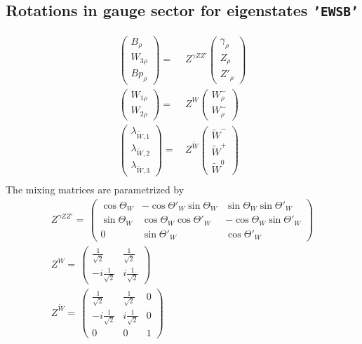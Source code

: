 \subsection{Rotations in gauge sector for eigenstates {\tt 'EWSB'} } 
\begin{align} 
\left(\begin{array}{c} 
B_{{\rho}}\\ 
W_{{3 \rho}}\\ 
Bp_{{\rho}}\end{array} \right) 
 = & \,Z^{\gamma Z Z'}
\left(\begin{array}{c} 
\gamma_{{\rho}}\\ 
Z_{{\rho}}\\ 
{Z'}_{{\rho}}\end{array} \right) \\ 
\left(\begin{array}{c} 
W_{{1 \rho}}\\ 
W_{{2 \rho}}\end{array} \right) 
 = & \,Z^{W}
\left(\begin{array}{c} 
W^-_{{\rho}}\\ 
W^-_{{\rho}}\end{array} \right) \\ 
\left(\begin{array}{c} 
\lambda_{{\tilde{W}},{1}}\\ 
\lambda_{{\tilde{W}},{2}}\\ 
\lambda_{{\tilde{W}},{3}}\end{array} \right) 
 = & \,Z^{\tilde{W}}
\left(\begin{array}{c} 
\tilde{W}^-\\ 
\tilde{W}^+\\ 
\tilde{W}^0\end{array} \right) \\ 
\end{align} 
The mixing matrices are parametrized by \\ 
\begin{align} 
Z^{\gamma Z Z'}= \, \left( 
\begin{array}{ccc} 
\cos\Theta_W  & - \cos{\Theta'}_W  \sin\Theta_W   & \sin\Theta_W  \sin{\Theta'}_W   \\ 
 \sin\Theta_W  & \cos\Theta_W  \cos{\Theta'}_W   & - \cos\Theta_W  \sin{\Theta'}_W   \\ 
 0 & \sin{\Theta'}_W  & \cos{\Theta'}_W \end{array} 
\right) \\ 
Z^{W}= \, \left( 
\begin{array}{cc} 
\frac{1}{\sqrt{2}} & \frac{1}{\sqrt{2}} \\ 
 -i \frac{1}{\sqrt{2}}  & i \frac{1}{\sqrt{2}} \end{array} 
\right) \\ 
Z^{\tilde{W}}= \, \left( 
\begin{array}{ccc} 
\frac{1}{\sqrt{2}} & \frac{1}{\sqrt{2}} & 0 \\ 
 -i \frac{1}{\sqrt{2}}  & i \frac{1}{\sqrt{2}}  & 0 \\ 
 0 & 0 & 1\end{array} 
\right) \\ 
\end{align} 
